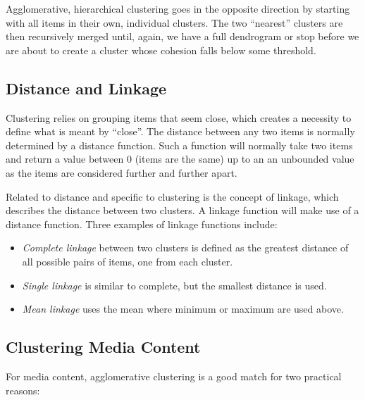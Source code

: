 Agglomerative, hierarchical clustering goes in the opposite direction
by starting with all items in their own, individual clusters.
The two ``nearest'' clusters are then recursively merged until, again,
we have a full dendrogram or stop before we are about to create a
cluster whose cohesion falls below some threshold.

\subsection{Distance and Linkage}

Clustering relies on grouping items that seem close, which creates
a necessity to define what is meant by ``close''. The distance between
any two items is normally determined by a distance
function.\cite{witten2005data} Such a function will normally take
two items and return a value between $0$ (items are the same) up to an
an unbounded value as the items are considered further and further
apart.

Related to distance and specific to clustering is the concept of
linkage, which describes the distance between two clusters. A linkage
function will make use of a distance function. Three examples
of linkage functions include:

\begin{itemize}
\item \emph{Complete linkage} between two clusters is defined as the
  greatest distance of all possible pairs of items, one from each
  cluster.
\item \emph{Single linkage} is similar to complete, but the smallest
  distance is used.
\item \emph{Mean linkage} uses the mean where minimum or maximum
  are used above.
\end{itemize}

\subsection{Clustering Media Content}
\label{sec:clustering-media}

For media content, agglomerative clustering is a good match for two
practical reasons:

